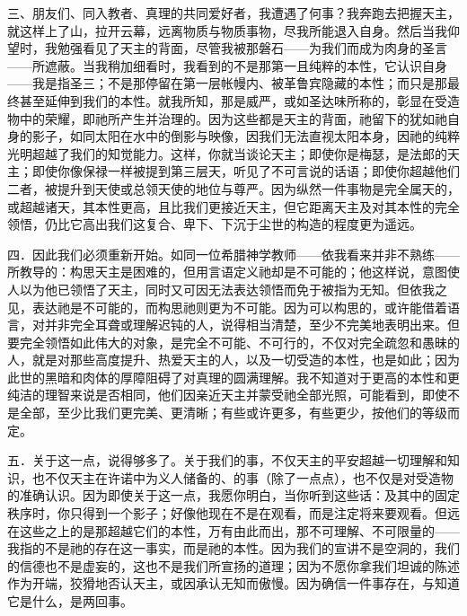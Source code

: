 三、朋友们、同入教者、真理的共同爱好者，我遭遇了何事？我奔跑去把握天主，就这样上了山，拉开云幕，远离物质与物质事物，尽我所能退入自身。然后当我仰望时，我勉强看见了天主的背面，尽管我被那磐石——为我们而成为肉身的圣言——所遮蔽。当我稍加细看时，我看到的不是那第一且纯粹的本性，它认识自身——我是指圣三；不是那停留在第一层帐幔内、被革鲁宾隐藏的本性；而只是那最终甚至延伸到我们的本性。就我所知，那是威严，或如圣达味所称的，彰显在受造物中的荣耀，即祂所产生并治理的。因为这些都是天主的背面，祂留下的犹如祂自身的影子，如同太阳在水中的倒影与映像，因我们无法直视太阳本身，因祂的纯粹光明超越了我们的知觉能力。这样，你就当谈论天主；即使你是梅瑟，是法郎的天主；即使你像保禄一样被提到第三层天，听见了不可言说的话语；即使你超越他们二者，被提升到天使或总领天使的地位与尊严。因为纵然一件事物是完全属天的，或超越诸天，其本性更高，且比我们更接近天主，但它距离天主及对其本性的完全领悟，仍比它高出我们这复合、卑下、下沉于尘世的构造的程度更为遥远。\par

四．因此我们必须重新开始。如同一位希腊神学教师——依我看来并非不熟练——所教导的：构思天主是困难的，但用言语定义祂却是不可能的；他这样说，意图使人以为他已领悟了天主，同时又可因无法表达领悟而免于被指为无知。但依我之见，表达祂是不可能的，而构思祂则更为不可能。因为可以构思的，或许能借着语言，对并非完全耳聋或理解迟钝的人，说得相当清楚，至少不完美地表明出来。但要完全领悟如此伟大的对象，是完全不可能、不可行的，不仅对完全疏忽和愚昧的人，就是对那些高度提升、热爱天主的人，以及一切受造的本性，也是如此；因为此世的黑暗和肉体的厚障阻碍了对真理的圆满理解。我不知道对于更高的本性和更纯洁的理智来说是否相同，他们因亲近天主并蒙受祂全部光照，可能看到，即使不是全部，至少比我们更完美、更清晰；有些或许更多，有些更少，按他们的等级而定。\par

五．关于这一点，说得够多了。关于我们的事，不仅天主的平安超越一切理解和知识，也不仅天主在许诺中为义人储备的、的事（除了一点点），也不仅是对受造物的准确认识。因为即使关于这一点，我愿你明白，当你听到这些话：及其中的固定秩序时，你只得到一个影子；好像他现在不是在观看，而是注定将来要观看。但远在这些之上的是那超越它们的本性，万有由此而出，那不可理解、不可限量的——我指的不是祂的存在这一事实，而是祂的本性。因为我们的宣讲不是空洞的，我们的信德也不是虚妄的，这也不是我们所宣扬的道理；因为不愿你拿我们坦诚的陈述作为开端，狡猾地否认天主，或因承认无知而傲慢。因为确信一件事存在，与知道它是什么，是两回事。\par

